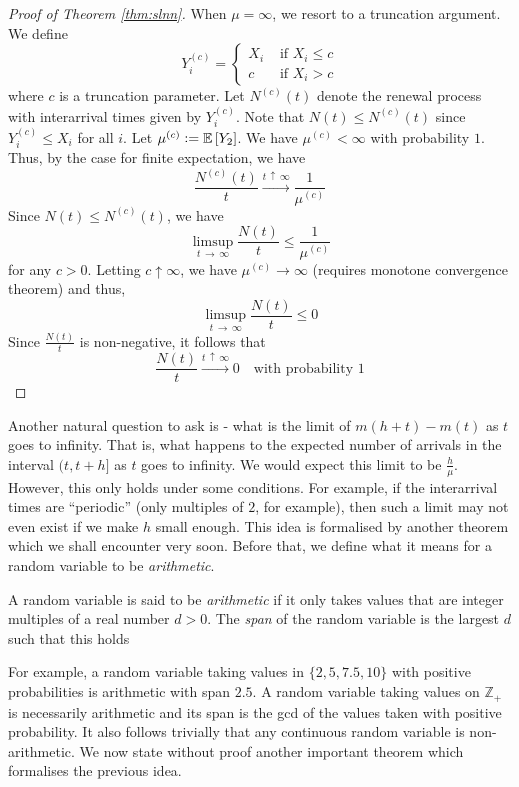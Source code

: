 \documentclass[12pt]{article}
\theoremstyle{definition}
\begin{document}
\begin{proof}[Proof of Theorem \ref{thm:slnn}]
        When $\mu = \infty$, we resort to a truncation argument. We define
        \[
            Y_i^{(c)} = \begin{cases}
                X_i & \text{ if } X_i \leq c \\
                c & \text{ if } X_i > c
            \end{cases}
        \]
        where $c$ is a truncation parameter. Let $N^{(c)}(t)$ denote the renewal process with interarrival times given by $Y_i^{(c)}$. Note that $N(t) \leq N^{(c)}(t)$ since $Y_i^{(c)} \leq X_i$ for all $i$. Let $\mu^{(c)} \vcentcolon= \mathbb{E} \left[ Y_2 \right]$. We have $\mu^{(c)} < \infty$ with probability $1$. Thus, by the case for finite expectation, we have
        \[
            \frac{N^{(c)}(t)}{t} \xrightarrow[]{t \, \uparrow \, \infty} \frac{1}{\mu^{(c)}}
        \]
        Since $N(t) \leq N^{(c)}(t)$, we have
        \[
            \limsup_{t \, \to \, \infty} \frac{N(t)}{t} \leq \frac{1}{\mu^{(c)}}
        \]
        for any $c > 0$. Letting $c \uparrow \infty$, we have $\mu^{(c)} \to \infty$ (requires monotone convergence theorem) and thus, 
        \[
            \limsup_{t \, \to \, \infty} \frac{N(t)}{t} \leq 0
        \]  
        Since $\frac{N(t)}{t}$ is non-negative, it follows that
        \[
            \frac{N(t)}{t} \xrightarrow[]{t \, \uparrow \, \infty} 0 \quad \text{with probability }1
        \]
\end{proof}

Another natural question to ask is - what is the limit of $m(h+t) - m(t)$ as $t$ goes to infinity. That is, what happens to the expected number of arrivals in the interval $(t,t+h]$ as $t$ goes to infinity. We would expect this limit to be $\frac{h}{\mu}$. However, this only holds under some conditions. For example, if the interarrival times are ``periodic'' (only multiples of $2$, for example), then such a limit may not even exist if we make $h$ small enough. This idea is formalised by another theorem which we shall encounter very soon. Before that, we define what it means for a random variable to be \emph{arithmetic}.

\begin{defn}
    A random variable is said to be \emph{arithmetic} if it only takes values that are integer multiples of a real number $d > 0$. The \emph{span} of the random variable is the largest $d$ such that this holds
\end{defn}

For example, a random variable taking values in $\{ 2,5, 7.5, 10\}$ with positive probabilities is arithmetic with span $2.5$. A random variable taking values on $\mathbb{Z}_+$ is necessarily arithmetic and its span is the gcd of the values taken with positive probability. It also follows trivially that any continuous random variable is non-arithmetic. We now state without proof another important theorem which formalises the previous idea.
\end{document}

